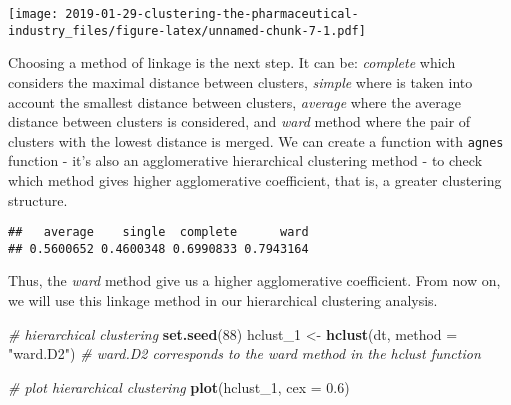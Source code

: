 \documentclass[]{article}
\newenvironment{Shaded}{\begin{snugshade}}{\end{snugshade}}
\newcommand{\KeywordTok}[1]{\textcolor[rgb]{0.13,0.29,0.53}{\textbf{#1}}}
\newcommand{\DataTypeTok}[1]{\textcolor[rgb]{0.13,0.29,0.53}{#1}}
\newcommand{\DecValTok}[1]{\textcolor[rgb]{0.00,0.00,0.81}{#1}}
\newcommand{\FloatTok}[1]{\textcolor[rgb]{0.00,0.00,0.81}{#1}}
\newcommand{\StringTok}[1]{\textcolor[rgb]{0.31,0.60,0.02}{#1}}
\newcommand{\CommentTok}[1]{\textcolor[rgb]{0.56,0.35,0.01}{\textit{#1}}}
\newcommand{\ControlFlowTok}[1]{\textcolor[rgb]{0.13,0.29,0.53}{\textbf{#1}}}
\newcommand{\OperatorTok}[1]{\textcolor[rgb]{0.81,0.36,0.00}{\textbf{#1}}}
\newcommand{\NormalTok}[1]{#1}
\begin{document}
\texttt{[image: 2019-01-29-clustering-the-pharmaceutical-industry\_files/figure-latex/unnamed-chunk-7-1.pdf]}

Choosing a method of linkage is the next step. It can be:
\emph{complete} which considers the maximal distance between clusters,
\emph{simple} where is taken into account the smallest distance between
clusters, \emph{average} where the average distance between clusters is
considered, and \emph{ward} method where the pair of clusters with the
lowest distance is merged. We can create a function with \texttt{agnes}
function - it's also an agglomerative hierarchical clustering method -
to check which method gives higher agglomerative coefficient, that is, a
greater clustering structure.

\begin{Shaded}
\end{Shaded}

\begin{verbatim}
##   average    single  complete      ward 
## 0.5600652 0.4600348 0.6990833 0.7943164
\end{verbatim}

Thus, the \emph{ward} method give us a higher agglomerative coefficient.
From now on, we will use this linkage method in our hierarchical
clustering analysis.

\begin{Shaded}
\begin{Highlighting}[]
\CommentTok{# hierarchical clustering }
\KeywordTok{set.seed}\NormalTok{(}\DecValTok{88}\NormalTok{)}
\NormalTok{hclust_}\DecValTok{1}\NormalTok{ <-}\StringTok{ }\KeywordTok{hclust}\NormalTok{(dt, }\DataTypeTok{method =} \StringTok{"ward.D2"}\NormalTok{) }\CommentTok{# ward.D2 corresponds to the ward                                                method in the hclust function}

\CommentTok{# plot hierarchical clustering}
\KeywordTok{plot}\NormalTok{(hclust_}\DecValTok{1}\NormalTok{, }\DataTypeTok{cex =} \FloatTok{0.6}\NormalTok{)}
\end{Highlighting}
\end{Shaded}
\end{document}
